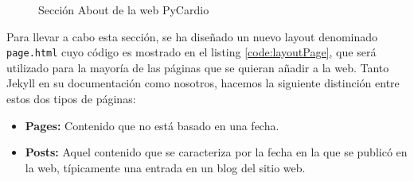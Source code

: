 \begin{figure}[H]
    \centering
    \caption{Sección About de la web PyCardio}
    \label{fig:aboutWeb}
\end{figure}

Para llevar a cabo esta sección, se ha diseñado un nuevo layout denominado \texttt{page.html} cuyo código es mostrado en el listing \ref{code:layoutPage}, que será utilizado para la mayoría de las páginas que se quieran añadir a la web. Tanto Jekyll en su documentación como nosotros, hacemos la siguiente distinción entre estos dos tipos de páginas:

\begin{itemize}
    \item \textbf{Pages: } Contenido que no está basado en una fecha.
    \item \textbf{Posts: } Aquel contenido que se caracteriza por la fecha en la que se publicó en la web, típicamente una entrada en un blog del sitio web.
\end{itemize}

